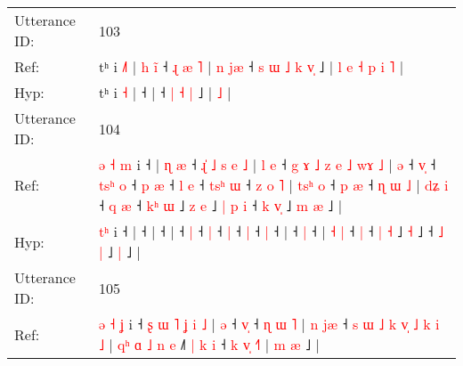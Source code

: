 \documentclass[10pt]{article}
\DeclareRobustCommand{\hl}[1]{{\textcolor{red}{#1}}}
\begin{document}
\begin{longtable}{ll}
 \\
\midrule
Utterance ID: & 103 \\
Ref: & tʰ i \hl{˩}\hl{˥} |\hl{ }\hl{h}\hl{ }\hl{i}\hl{̃} ˧\hl{ }\hl{ɻ}\hl{ }\hl{æ}\hl{ }\hl{˥} |\hl{ }\hl{n}\hl{ }\hl{j}\hl{æ} ˧\hl{ }\hl{s}\hl{ }\hl{ɯ} \hl{˩} \hl{k} \hl{v}\hl{̩} ˩ |\hl{ }\hl{l}\hl{ }\hl{e}\hl{ }\hl{˧}\hl{ }\hl{p}\hl{ }\hl{i} \hl{˥} |
 \\
Hyp: & tʰ i \hl{}\hl{˧} |\hl{}\hl{}\hl{}\hl{}\hl{} ˧\hl{}\hl{}\hl{}\hl{}\hl{}\hl{} |\hl{}\hl{}\hl{}\hl{}\hl{} ˧\hl{}\hl{}\hl{}\hl{} \hl{|} \hl{˧} \hl{}\hl{|} ˩ |\hl{}\hl{}\hl{}\hl{}\hl{}\hl{}\hl{}\hl{}\hl{}\hl{} \hl{˩} |
 \\
\midrule
Utterance ID: & 104 \\
Ref: & \hl{ə}\hl{ }\hl{˧}\hl{ }\hl{m} i ˧ |\hl{ }\hl{ɳ}\hl{ }\hl{æ} ˧\hl{ }\hl{ɻ}\hl{̍}\hl{ }\hl{˩}\hl{ }\hl{s}\hl{ }\hl{e}\hl{ }\hl{˩} |\hl{ }\hl{l}\hl{ }\hl{e} ˧\hl{ }\hl{g}\hl{ }\hl{ɤ}\hl{ }\hl{˩}\hl{ }\hl{z}\hl{ }\hl{e}\hl{ }\hl{˩}\hl{ }\hl{w}\hl{ɤ}\hl{ }\hl{˩} |\hl{ }\hl{ə} ˧ \hl{v}\hl{̩} ˧\hl{ }\hl{t}\hl{s}\hl{ʰ} \hl{o} ˧\hl{ }\hl{p} \hl{æ} ˧\hl{ }\hl{l} \hl{e} ˧\hl{ }\hl{t}\hl{s}\hl{ʰ} \hl{ɯ} ˧\hl{ }\hl{z}\hl{ }\hl{o}\hl{ }\hl{˥} |\hl{ }\hl{t}\hl{s}\hl{ʰ}\hl{ }\hl{o} ˧\hl{ }\hl{p} \hl{æ} ˧\hl{ }\hl{ɳ}\hl{ }\hl{ɯ}\hl{ }\hl{˩} | \hl{d}\hl{ʑ} \hl{i} ˧\hl{ }\hl{q} \hl{æ} ˧ \hl{k}\hl{ʰ} \hl{ɯ} ˩\hl{ }\hl{z} \hl{e} ˩\hl{ }\hl{|}\hl{ }\hl{p}\hl{ }\hl{i} ˧ \hl{k} \hl{v}\hl{̩} ˩\hl{ }\hl{m} \hl{æ} ˩ |
 \\
Hyp: & \hl{}\hl{}\hl{}\hl{t}\hl{ʰ} i ˧ |\hl{}\hl{}\hl{}\hl{} ˧\hl{}\hl{}\hl{}\hl{}\hl{}\hl{}\hl{}\hl{}\hl{}\hl{}\hl{} |\hl{}\hl{}\hl{}\hl{} ˧\hl{}\hl{}\hl{}\hl{}\hl{}\hl{}\hl{}\hl{}\hl{}\hl{}\hl{}\hl{}\hl{}\hl{}\hl{}\hl{}\hl{} |\hl{}\hl{} ˧ \hl{}\hl{|} ˧\hl{}\hl{}\hl{}\hl{} \hl{|} ˧\hl{}\hl{} \hl{|} ˧\hl{}\hl{} \hl{|} ˧\hl{}\hl{}\hl{}\hl{} \hl{|} ˧\hl{}\hl{}\hl{}\hl{}\hl{}\hl{} |\hl{}\hl{}\hl{}\hl{}\hl{}\hl{} ˧\hl{}\hl{} \hl{|} ˧\hl{}\hl{}\hl{}\hl{}\hl{}\hl{} | \hl{}\hl{˧} \hl{|} ˧\hl{}\hl{} \hl{|} ˧ \hl{}\hl{|} \hl{˧} ˩\hl{}\hl{} \hl{˧} ˩\hl{}\hl{}\hl{}\hl{}\hl{}\hl{} ˧ \hl{˩} \hl{}\hl{|} ˩\hl{}\hl{} \hl{|} ˩ |
 \\
\midrule
Utterance ID: & 105 \\
Ref: & \hl{ə}\hl{ }\hl{˧}\hl{ }\hl{ʝ} i ˧\hl{ }\hl{ʂ}\hl{ }\hl{ɯ}\hl{ }\hl{˥}\hl{ }\hl{ʝ}\hl{ }\hl{i}\hl{ }\hl{˩} |\hl{ }\hl{ə} ˧ \hl{v}\hl{̩} ˧\hl{ }\hl{ɳ}\hl{ }\hl{ɯ}\hl{ }\hl{˥} |\hl{ }\hl{n}\hl{ }\hl{j}\hl{æ} ˧\hl{ }\hl{s}\hl{ }\hl{ɯ}\hl{ }\hl{˩}\hl{ }\hl{k}\hl{ }\hl{v}\hl{̩}\hl{ }\hl{˩}\hl{ }\hl{k}\hl{ }\hl{i}\hl{ }\hl{˩} |\hl{ }\hl{q}\hl{ʰ}\hl{ }\hl{ɑ}\hl{ }\hl{˩}\hl{ }\hl{n} \hl{e} ˩\hl{˥}\hl{ }\hl{|}\hl{ }\hl{k}\hl{ }\hl{i} ˧\hl{ }\hl{k}\hl{ }\hl{v}\hl{̩} \hl{˧}\hl{˥} |\hl{ }\hl{m}\hl{ }\hl{æ} ˩ |

\end{longtable}
\end{document}
